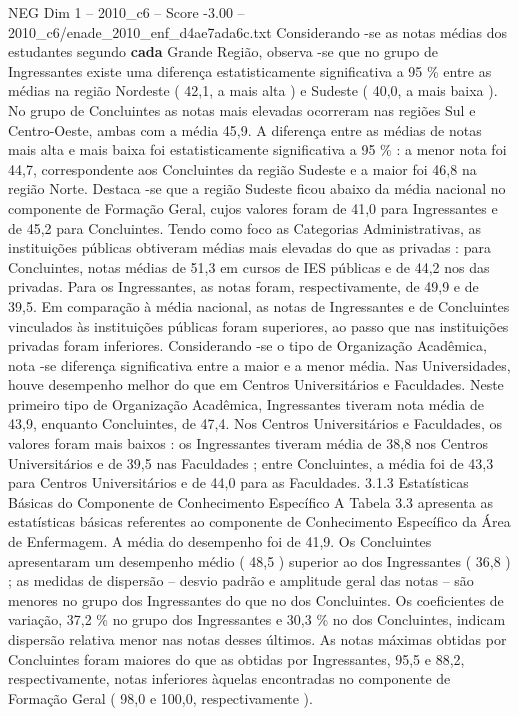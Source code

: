 \begin{textsample}{NEG Dim 1 – 2010\_c6 – Score -3.00 – 2010\_c6/enade\_2010\_enf\_d4ae7ada6c.txt}
Considerando -se as notas médias dos estudantes segundo \textbf{cada} Grande Região, observa -se que no grupo de Ingressantes existe uma diferença estatisticamente significativa a 95 \% entre as médias na região Nordeste ( 42,1, a mais alta ) e Sudeste ( 40,0, a mais baixa ).
No grupo de Concluintes as notas mais elevadas ocorreram nas regiões Sul e Centro-Oeste, ambas com a média 45,9.
A diferença entre as médias de notas mais alta e mais baixa foi estatisticamente significativa a 95 \% : a menor nota foi 44,7, correspondente aos Concluintes da região Sudeste e a maior foi 46,8 na região Norte.
Destaca -se que a região Sudeste ficou abaixo da média nacional no componente de Formação Geral, cujos valores foram de 41,0 para Ingressantes e de 45,2 para Concluintes.
Tendo como foco as Categorias Administrativas, as instituições públicas obtiveram médias mais elevadas do que as privadas : para Concluintes, notas médias de 51,3 em cursos de IES públicas e de 44,2 nos das privadas.
Para os Ingressantes, as notas foram, respectivamente, de 49,9 e de 39,5.
Em comparação à média nacional, as notas de Ingressantes e de Concluintes vinculados às instituições públicas foram superiores, ao passo que nas instituições privadas foram inferiores.
Considerando -se o tipo de Organização Acadêmica, nota -se diferença significativa entre a maior e a menor média.
Nas Universidades, houve desempenho melhor do que em Centros Universitários e Faculdades.
Neste primeiro tipo de Organização Acadêmica, Ingressantes tiveram nota média de 43,9, enquanto Concluintes, de 47,4.
Nos Centros Universitários e Faculdades, os valores foram mais baixos : os Ingressantes tiveram média de 38,8 nos Centros Universitários e de 39,5 nas Faculdades ; entre Concluintes, a média foi de 43,3 para Centros Universitários e de 44,0 para as Faculdades. 3.1.3 Estatísticas Básicas do Componente de Conhecimento Específico A Tabela 3.3 apresenta as estatísticas básicas referentes ao componente de Conhecimento Específico da Área de Enfermagem.
A média do desempenho foi de 41,9.
Os Concluintes apresentaram um desempenho médio ( 48,5 ) superior ao dos Ingressantes ( 36,8 ) ; as medidas de dispersão – desvio padrão e amplitude geral das notas – são menores no grupo dos Ingressantes do que no dos Concluintes.
Os coeficientes de variação, 37,2 \% no grupo dos Ingressantes e 30,3 \% no dos Concluintes, indicam dispersão relativa menor nas notas desses últimos.
As notas máximas obtidas por Concluintes foram maiores do que as obtidas por Ingressantes, 95,5 e 88,2, respectivamente, notas inferiores àquelas encontradas no componente de Formação Geral ( 98,0 e 100,0, respectivamente ).

\end{textsample}
